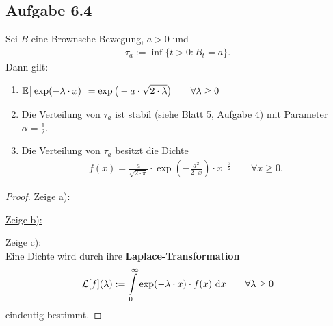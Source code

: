 \subsection{Aufgabe 6.4}
Sei $B$ eine Brownsche Bewegung, $a>0$ und
\begin{align*}
	\tau_a:=\inf\big\lbrace t>0:B_t=a\big\rbrace.
\end{align*}
Dann gilt:
\begin{enumerate}[label=\alph*)]
	\item $\begin{aligned}
		\mathbb{E}\big[\exp(-\lambda\cdot x)\big]=\exp\big(-a\cdot\sqrt{2\cdot\lambda}\big)\qquad\forall \lambda\geq0
	\end{aligned}$
	\item Die Verteilung von $\tau_a$ ist stabil (siehe Blatt 5, Aufgabe 4) mit Parameter $\alpha=\frac{1}{2}$.
	\item Die Verteilung von $\tau_a$ besitzt die Dichte
	\begin{align*}
		f(x)=\frac{a}{\sqrt{2\cdot\pi}}\cdot\exp\left(-\frac{a^2}{2\cdot x}\right)\cdot x^{-\frac{3}{2}}\qquad\forall x\geq0.
	\end{align*}
\end{enumerate}

\begin{proof}
	\underline{Zeige a):}

	\underline{Zeige b):}

	\underline{Zeige c):}\\
	Eine Dichte wird durch ihre \textbf{Laplace-Transformation}
	\begin{align*}
		\mathcal{L}[f](\lambda):=\int\limits_0^\infty\exp(-\lambda\cdot x)\cdot f(x)\text{ d} x\qquad\forall\lambda\geq0
	\end{align*}
	eindeutig bestimmt.

\end{proof}